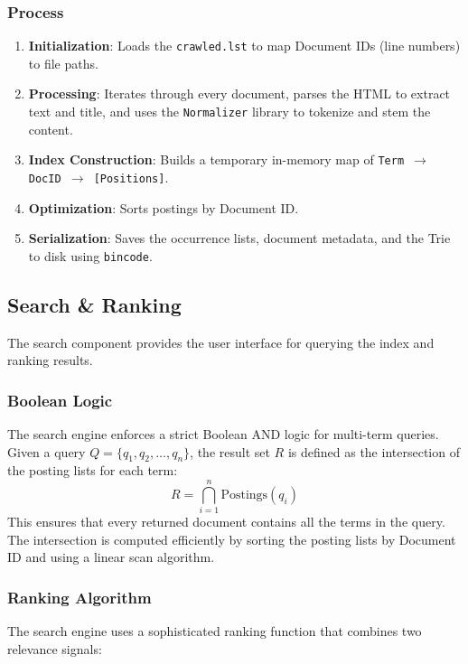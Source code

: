 \documentclass[11pt, a4paper]{article}
\begin{document}
\subsubsection*{Process}
\begin{enumerate}
    \item \textbf{Initialization}: Loads the \texttt{crawled.lst} to map Document IDs (line numbers) to file paths.
    \item \textbf{Processing}: Iterates through every document, parses the HTML to extract text and title, and uses the \texttt{Normalizer} library to tokenize and stem the content.
    \item \textbf{Index Construction}: Builds a temporary in-memory map of \texttt{Term $\rightarrow$ DocID $\rightarrow$ [Positions]}.
    \item \textbf{Optimization}: Sorts postings by Document ID.
    \item \textbf{Serialization}: Saves the occurrence lists, document metadata, and the Trie to disk using \texttt{bincode}.
\end{enumerate}

\subsection{Search \& Ranking}
The search component provides the user interface for querying the index and ranking results.

\subsubsection*{Boolean Logic}
The search engine enforces a strict Boolean AND logic for multi-term queries. Given a query $Q = \{q_1, q_2, \dots, q_n\}$, the result set $R$ is defined as the intersection of the posting lists for each term:
\[ R = \bigcap_{i=1}^{n} \text{Postings}(q_i) \]
This ensures that every returned document contains all the terms in the query. The intersection is computed efficiently by sorting the posting lists by Document ID and using a linear scan algorithm.

\subsubsection*{Ranking Algorithm}
The search engine uses a sophisticated ranking function that combines two relevance signals:
\end{document}
